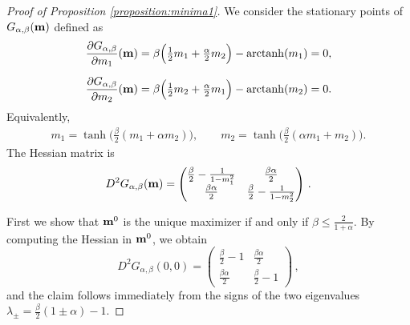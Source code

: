 \documentclass[11pt,oneside]{amsart}
\numberwithin{equation}{section}  %
\theoremstyle{plain}
\theoremstyle{remark}
\def \bm {{\bf m}}
\begin{document}
\begin{proof}[Proof of Proposition \ref{proposition:minima1}]
We consider the stationary points of $G_{\alpha,\beta}(\bm)$ defined as
\begin{equation}\label{eq:grad}
\begin{split}
\frac{\partial G_{\alpha,\beta}}{\partial m_1}(\bm)
&= 
\beta\Big(\tfrac{1}{2}m_1 +\tfrac{\alpha}{2}m_2\Big)
- \operatorname{arctanh}(m_1)=0,
\\[2mm]
\frac{\partial G_{\alpha,\beta}}{\partial m_2}(\bm)
&= 
\beta\Big(\tfrac{1}{2}m_2 + \tfrac{\alpha}{2}m_1\Big)
- \operatorname{arctanh}(m_2)=0.
\end{split}
\end{equation}
Equivalently,
\begin{align}\label{eq:system_m}
m_1=\tanh\!\Big(\frac{\beta}{2}(m_1+\alpha m_2)\Big),
\qquad
m_2=\tanh\!\Big(\frac{\beta}{2}(\alpha m_1+m_2)\Big).
\end{align}
The Hessian matrix is
\begin{align*}
    D^2G_{\alpha,\beta}(\bm)=\begin{pmatrix}
        \frac{\beta}{2}-\frac{1}{1-m_1^2} & \frac{\beta \alpha}{2} \\
        \frac{\beta \alpha}{2} & \frac{\beta}{2}-\frac{1}{1-m_2^2}
    \end{pmatrix}\,.
\end{align*}

First we show that $\bm^0$ is the unique maximizer if and only if $\beta \leq \frac{2}{1+\alpha}$. By computing the Hessian in $\bm^0$, we obtain
\begin{equation}\label{eq:Hessian} D^2G_{\alpha,\beta}(0,0)=\begin{pmatrix}
        \frac{\beta}{2}-1& \frac{\beta \alpha}{2} \\
        \frac{\beta \alpha}{2} & \frac{\beta}{2}-1
    \end{pmatrix}\,,
\end{equation}
and the claim follows immediately from the signs of the two eigenvalues $\lambda_\pm=\frac{\beta}{2} (1\pm \alpha)-1$.


\end{proof}
\end{document}

